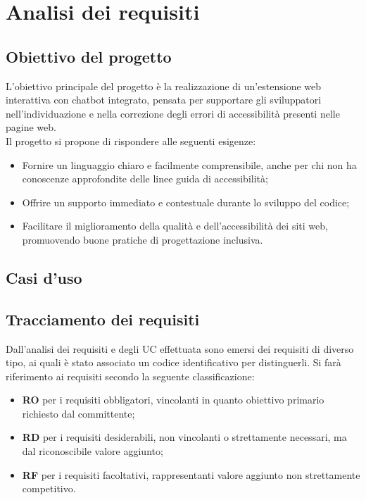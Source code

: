 \chapter{Analisi dei requisiti}
\label{chap:analisi-requisiti}

\section{Obiettivo del progetto}
\label{sec:obiettivo}
\noindent L’obiettivo principale del progetto è la realizzazione di un’estensione web interattiva con chatbot integrato, pensata per supportare gli sviluppatori nell’individuazione e nella correzione degli errori di accessibilità presenti nelle pagine web. \\Il progetto si propone di rispondere alle seguenti esigenze:
\begin{itemize}
    \item Fornire un linguaggio chiaro e facilmente comprensibile, anche per chi non ha conoscenze approfondite delle linee guida di accessibilità;
    \item Offrire un supporto immediato e contestuale durante lo sviluppo del codice;
    \item Facilitare il miglioramento della qualità e dell’accessibilità dei siti web, promuovendo buone pratiche di progettazione inclusiva.
\end{itemize}

\section{Casi d'uso}
\label{sec:uc}

\section{Tracciamento dei requisiti}
\label{sec:req}
\noindent Dall’analisi dei requisiti e degli UC effettuata sono emersi dei requisiti di diverso tipo, ai quali è stato associato un codice identificativo per distinguerli. Si farà riferimento ai requisiti secondo la seguente classificazione:
\begin{itemize}
    \item \textbf{RO} per i requisiti obbligatori, vincolanti in quanto obiettivo primario richiesto dal committente;
    \item \textbf{RD} per i requisiti desiderabili, non vincolanti o strettamente necessari, ma dal riconoscibile valore aggiunto;
    \item \textbf{RF} per i requisiti facoltativi, rappresentanti valore aggiunto non strettamente competitivo.
\end{itemize}

